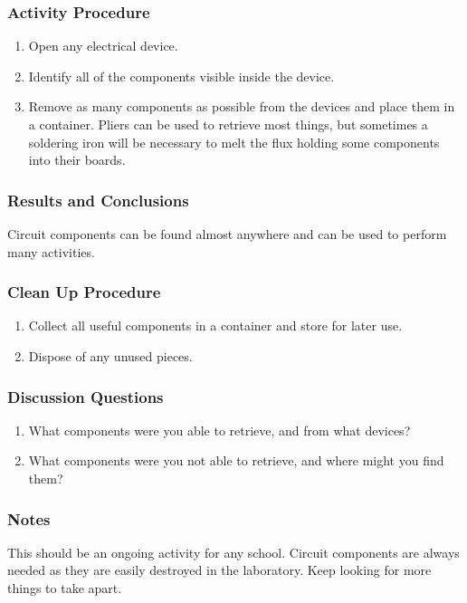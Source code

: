 \subsubsection*{Activity Procedure}
\begin{enumerate}
\item{Open any electrical device.} 
\item{Identify all of the components visible inside the device.} 
\item{Remove as many components as possible from the devices and place them in a container. Pliers can be used to retrieve most things, but sometimes a soldering iron will be necessary to melt the flux holding some components into their boards.} 
\end{enumerate}

\subsubsection*{Results and Conclusions}
Circuit components can be found almost anywhere and can be used to perform many activities.

\subsubsection*{Clean Up Procedure}
\begin{enumerate}
\item{Collect all useful components in a container and store for later use.} 
\item{Dispose of any unused pieces.} 
\end{enumerate}

\subsubsection*{Discussion Questions}
\begin{enumerate}
\item{What components were you able to retrieve, and from what devices?}
\item{What components were you not able to retrieve, and where might you find them?}
\end{enumerate}

\subsubsection*{Notes}
This should be an ongoing activity for any school. Circuit components are always needed as they are easily destroyed in the laboratory. Keep looking for more things to take apart. 


